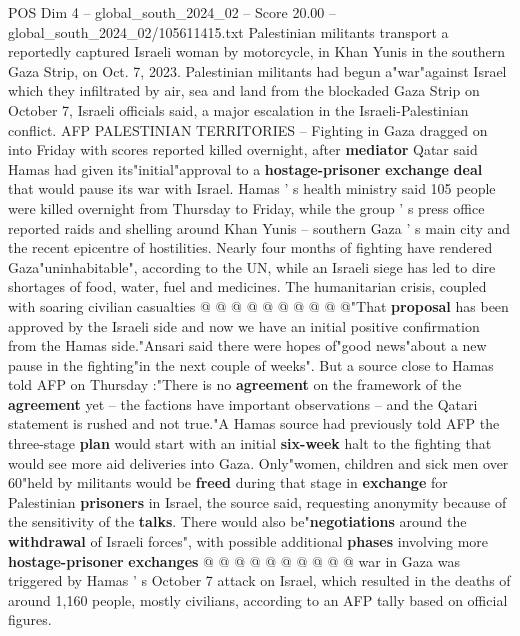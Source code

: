 \begin{textsample}{POS Dim 4 – global\_south\_2024\_02 – Score 20.00 – global\_south\_2024\_02/105611415.txt}  \label{ex:f4_pos_079}
Palestinian militants transport a reportedly captured Israeli woman by motorcycle, in Khan Yunis in the southern Gaza Strip, on Oct. 7, 2023.
Palestinian militants had begun a"war"against Israel which they infiltrated by air, sea and land from the blockaded Gaza Strip on October 7, Israeli officials said, a major escalation in the Israeli-Palestinian conflict.
AFP PALESTINIAN TERRITORIES -- Fighting in Gaza dragged on into Friday with scores reported killed overnight, after \textbf{mediator} Qatar said Hamas had given its"initial"approval to a \textbf{hostage-prisoner} \textbf{exchange} \textbf{deal} that would pause its war with Israel.
Hamas ' s health ministry said 105 people were killed overnight from Thursday to Friday, while the group ' s press office reported raids and shelling around Khan Yunis -- southern Gaza ' s main city and the recent epicentre of hostilities.
Nearly four months of fighting have rendered Gaza"uninhabitable", according to the UN, while an Israeli siege has led to dire shortages of food, water, fuel and medicines.
The humanitarian crisis, coupled with soaring civilian casualties @ @ @ @ @ @ @ @ @ @"That \textbf{proposal} has been approved by the Israeli side and now we have an initial positive confirmation from the Hamas side."Ansari said there were hopes of"good news"about a new pause in the fighting"in the next couple of weeks".
But a source close to Hamas told AFP on Thursday :"There is no \textbf{agreement} on the framework of the \textbf{agreement} yet -- the factions have important observations -- and the Qatari statement is rushed and not true."A Hamas source had previously told AFP the three-stage \textbf{plan} would start with an initial \textbf{six-week} halt to the fighting that would see more aid deliveries into Gaza.
Only"women, children and sick men over 60"held by militants would be \textbf{freed} during that stage in \textbf{exchange} for Palestinian \textbf{prisoners} in Israel, the source said, requesting anonymity because of the sensitivity of the \textbf{talks}.
There would also be"\textbf{negotiations} around the \textbf{withdrawal} of Israeli forces", with possible additional \textbf{phases} involving more \textbf{hostage-prisoner} \textbf{exchanges} @ @ @ @ @ @ @ @ @ @ war in Gaza was triggered by Hamas ' s October 7 attack on Israel, which resulted in the deaths of around 1,160 people, mostly civilians, according to an AFP tally based on official figures.

\end{textsample}
